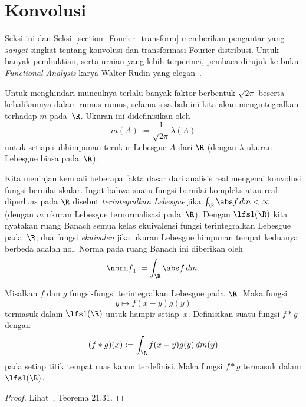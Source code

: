 \section{Konvolusi}

Seksi ini dan Seksi~\ref{section_Fourier_transform} memberikan pengantar yang \emph{sangat} singkat tentang konvolusi
dan transformasi Fourier distribusi. Untuk banyak pembuktian, serta uraian yang lebih terperinci, pembaca dirujuk
ke buku \emph{Functional Analysis} karya Walter Rudin yang elegan~\cite{Rudin:1991}.

Untuk menghindari munculnya terlalu banyak faktor berbentuk $\sqrt{2\pi}$ beserta kebalikannya dalam rumus-rumus, selama
sisa bab ini kita akan mengintegralkan terhadap
 $m$ pada~$\R$. Ukuran ini didefinisikan oleh
   \[ m(A) := \frac1{\sqrt{2\pi}}\lambda(A) \]
untuk setiap subhimpunan terukur Lebesgue $A$ dari $\R$ (dengan $\lambda$ ukuran Lebesgue biasa pada~$\R$).

Kita meninjau kembali beberapa fakta dasar dari analisis real mengenai konvolusi fungsi bernilai skalar. Ingat bahwa suatu fungsi bernilai kompleks atau
real diperluas pada $\R$ disebut
\emph{terintegralkan Lebesgue} jika $\int_\R\abs f\, dm < \infty$
(dengan $m$ ukuran Lebesgue ternormalisasi pada~$\R$).
Dengan $\lfs 1(\R)$ kita nyatakan ruang Banach semua kelas ekuivalensi fungsi terintegralkan Lebesgue pada~$\R$; dua fungsi \emph{ekuivalen}
jika ukuran Lebesgue himpunan tempat keduanya berbeda adalah nol. Norma pada ruang Banach ini
diberikan oleh
   \[ {\norm f}_1 := \int_\R \abs f\,dm. \]

\begin{prop} Misalkan $f$ dan $g$ fungsi-fungsi terintegralkan Lebesgue pada~$\R$. Maka fungsi
   \[ y \mapsto f(x - y)g(y) \]
termasuk dalam $\lfs 1(\R)$ untuk hampir setiap~$x$. Definisikan suatu
fungsi $f \ast g$ dengan
   \[ (f \ast g)(x) := \int_\R f(x - y)g(y)\,dm(y) \]
pada setiap titik tempat ruas kanan terdefinisi. Maka fungsi $f \ast g$ termasuk dalam $\lfs 1(\R)$.
\end{prop}

\begin{proof} Lihat~\cite{HewittS:1965}, Teorema 21.31.  \ns
\end{proof}

